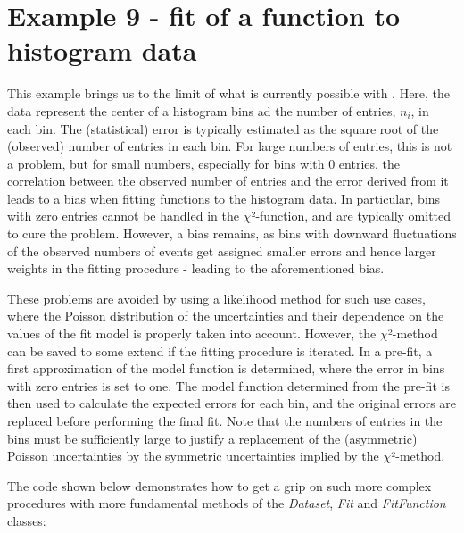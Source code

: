 \documentclass[a4paper,10pt,english]{sphinxmanual}
\begin{document}
\section{Example 9 - fit of a function to histogram data}
\label{index:example-9-fit-of-a-function-to-histogram-data}
This example brings us to the limit of what is currently
possible with . Here, the data represent the
center of a histogram bins ad the number of entries, \(n_i\),
in each bin. The (statistical) error is typically estimated
as the square root of the (observed) number of entries in each bin.
For large numbers of entries, this is not a problem,
but for small numbers, especially for bins with 0 entries,
the correlation between the observed number of entries and
the error derived from it leads to a bias when fitting
functions to the histogram data. In particular, bins with
zero entries cannot be handled in the \(\chi\)²-function, and are
typically omitted to cure the problem.  However, a bias
remains, as bins with downward fluctuations of the
observed numbers of events get assigned smaller errors
and hence larger weights in the fitting procedure - leading
to the aforementioned bias.

These problems are avoided by using a likelihood method for
such use cases, where the Poisson distribution of the uncertainties
and their dependence on the values of the fit model is properly
taken into account. However, the \(\chi\)²-method can be saved to some
extend if the fitting procedure is iterated. In a pre-fit, a
first approximation of the model function is determined, where
the error in bins with zero entries is set to one. The model
function determined from the pre-fit is then used to calculate
the expected errors for each bin, and the original errors are
replaced before performing the final fit. Note that the numbers
of entries in the bins must be sufficiently large to justify
a replacement of the (asymmetric) Poisson uncertainties by
the symmetric uncertainties implied by the \(\chi\)²-method.

The code shown below demonstrates
how to get a grip on such more complex procedures with
more fundamental methods of the \emph{Dataset}, \emph{Fit} and
\emph{FitFunction} classes:
\end{document}
